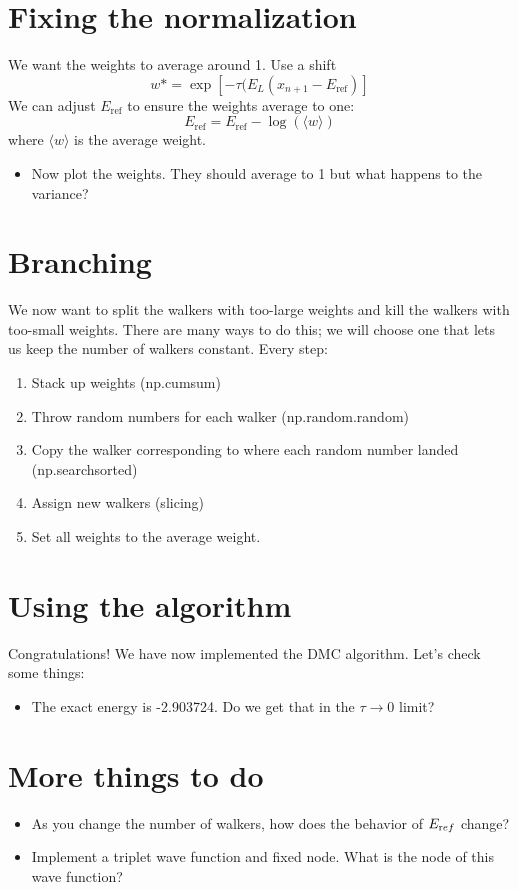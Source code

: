 \documentclass[12pt]{article}
\begin{document}
\section{Fixing the normalization}

We want the weights to average around 1.
Use a shift 
\begin{equation}
w*=	\exp[-\tau (E_L(x_{n+1}-E_{\text{ref}})] 
\end{equation}
We can adjust $E_{\text {ref}}$ to ensure the weights average to one:
\begin{equation}
E_{\text{ref}}=E_{\text{ref}}-\log(\langle w \rangle) 
\end{equation}
where $\langle w \rangle$ is the average weight. 

\begin{itemize}
\item Now plot the weights. They should average to 1 but what happens to the variance?
\end{itemize}

\section{Branching} 

We now want to split the walkers with too-large weights and kill the walkers with too-small weights. 
There are many ways to do this; we will choose one that lets us keep the number of walkers constant. 
Every step:
\begin{enumerate}
\item Stack up weights (np.cumsum)
\item Throw random numbers for each walker (np.random.random)
\item Copy the walker corresponding to where each random number landed (np.searchsorted)
\item Assign new walkers (slicing)
\item Set all weights to the average weight.
\end{enumerate}
\section{Using the algorithm}
Congratulations! We have now implemented the DMC algorithm. 
Let's check some things:

\begin{itemize}
\item The exact energy is -2.903724. Do we get that in the $\tau\rightarrow0$ limit?
\end{itemize}

\section{More things to do}
\begin{itemize}
\item As you change the number of walkers, how does the behavior of $E_{\text ref}$ change?
\item Implement a triplet wave function and fixed node. What is the node of this wave function?
\end{itemize}
\end{document}
